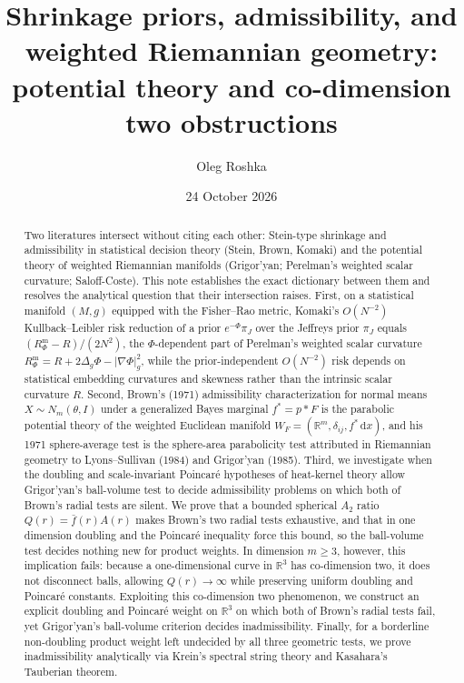 \documentclass[a4paper,11pt,noarxiv]{quantumarticle}
\title{Shrinkage priors, admissibility, and weighted Riemannian
geometry: potential theory and co-dimension two obstructions}
\author{Oleg Roshka}
\affiliation{Independent Researcher \textnormal{--}
\href{https://orcid.org/0009-0009-3075-9417}{ORCID
0009-0009-3075-9417}}
\date{24 October 2026}
\newcommand{\R}{\mathbb{R}}
\newcommand{\Rm}{R^{\mathrm m}}
\newcommand{\abs}[1]{\lvert #1\rvert}
\newcommand{\dd}{\,\mathrm{d}}
\newcommand{\grad}{\nabla}
\newcommand{\fbar}{\bar f}
\theoremstyle{plain}
\theoremstyle{definition}
\theoremstyle{remark}
\begin{document}
\maketitle

\begin{abstract}
Two literatures intersect without citing each other: Stein-type
shrinkage and admissibility in statistical decision theory (Stein,
Brown, Komaki) and the potential theory of weighted Riemannian
manifolds (Grigor'yan; Perelman's weighted scalar curvature;
Saloff-Coste). This note establishes the exact dictionary between
them and resolves the analytical question that their intersection
raises. First, on a statistical manifold $(M,g)$ equipped with the
Fisher--Rao metric, Komaki's $O(N^{-2})$ Kullback--Leibler risk
reduction of a prior $e^{-\Phi}\pi_J$ over the Jeffreys prior $\pi_J$
equals $(\Rm_\Phi-R)/(2N^2)$, the $\Phi$-dependent part of Perelman's
weighted scalar curvature $\Rm_\Phi=R+2\Delta_g\Phi-\abs{\grad\Phi}_g^2$,
while the prior-independent $O(N^{-2})$ risk depends on statistical
embedding curvatures and skewness rather than the intrinsic scalar
curvature $R$. Second, Brown's (1971) admissibility characterization
for normal means $X\sim N_m(\theta,I)$ under a generalized Bayes
marginal $f^*=p*F$ is the parabolic potential theory of the weighted
Euclidean manifold $W_F=(\R^m,\delta_{ij},f^*\dd x)$, and his 1971
sphere-average test is the sphere-area parabolicity test attributed in
Riemannian geometry to Lyons--Sullivan (1984) and Grigor'yan (1985).
Third, we investigate when the doubling and scale-invariant Poincar\'e
hypotheses of heat-kernel theory allow Grigor'yan's ball-volume test
to decide admissibility problems on which both of Brown's radial tests
are silent. We prove that a bounded spherical $A_2$ ratio
$Q(r)=\fbar(r)A(r)$ makes Brown's two radial tests exhaustive, and
that in one dimension doubling and the Poincar\'e inequality force this
bound, so the ball-volume test decides nothing new for product weights.
In dimension $m\ge3$, however, this implication fails: because a
one-dimensional curve in $\R^3$ has co-dimension two, it does not
disconnect balls, allowing $Q(r)\to\infty$ while preserving uniform
doubling and Poincar\'e constants. Exploiting this co-dimension two
phenomenon, we construct an explicit doubling and Poincar\'e weight on
$\R^3$ on which both of Brown's radial tests fail, yet Grigor'yan's
ball-volume criterion decides inadmissibility. Finally, for a
borderline non-doubling product weight left undecided by all three
geometric tests, we prove inadmissibility analytically via Krein's
spectral string theory and Kasahara's Tauberian theorem.
\end{abstract}
\end{document}
